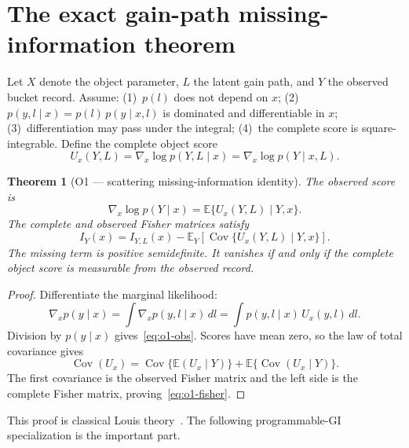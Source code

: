 \documentclass[11pt]{article}
\newcommand{\Cov}{\operatorname{Cov}}
\newcommand{\E}{\mathbb{E}}
\newtheorem{theorem}{Theorem}
\theoremstyle{remark}
\begin{document}
\section{The exact gain-path missing-information theorem}
\label{sec:o1}
Let $X$ denote the object parameter, $L$ the latent gain path, and $Y$ the
observed bucket record. Assume: (1)~$p(l)$ does not depend on $x$;
(2)~$p(y,l\mid x)=p(l)\,p(y\mid x,l)$ is dominated and differentiable in $x$;
(3)~differentiation may pass under the integral; (4)~the complete score is
square-integrable. Define the complete object score
\begin{equation*}
U_x(Y,L) = \nabla_x \log p(Y,L\mid x) = \nabla_x \log p(Y\mid x,L).
\end{equation*}

\begin{theorem}[O1 --- scattering missing-information identity]
\label{thm:o1}
The observed score is
\begin{equation}
\nabla_x \log p(Y\mid x)
= \E\{ U_x(Y,L) \mid Y, x \}.
\tag{O1.1}\label{eq:o1-obs}
\end{equation}
The complete and observed Fisher matrices satisfy
\begin{equation}
I_Y(x) = I_{Y,L}(x) - \E_Y\!\left[ \Cov\{ U_x(Y,L) \mid Y, x \} \right].
\tag{O1.2}\label{eq:o1-fisher}
\end{equation}
The missing term is positive semidefinite. It vanishes if and only if the
complete object score is measurable from the observed record.
\end{theorem}

\begin{proof}
Differentiate the marginal likelihood:
\begin{equation*}
\nabla_x p(y\mid x)
= \int \nabla_x p(y,l\mid x)\, dl
= \int p(y,l\mid x)\, U_x(y,l)\, dl.
\end{equation*}
Division by $p(y\mid x)$ gives~\eqref{eq:o1-obs}. Scores have mean zero, so the
law of total covariance gives
\begin{equation*}
\Cov(U_x) = \Cov\{ \E(U_x\mid Y) \} + \E\{ \Cov(U_x\mid Y) \}.
\end{equation*}
The first covariance is the observed Fisher matrix and the left side is the
complete Fisher matrix, proving~\eqref{eq:o1-fisher}.
\end{proof}

This proof is classical Louis theory~\cite{louis1982}. The following
programmable-GI specialization is the important part.
\end{document}

